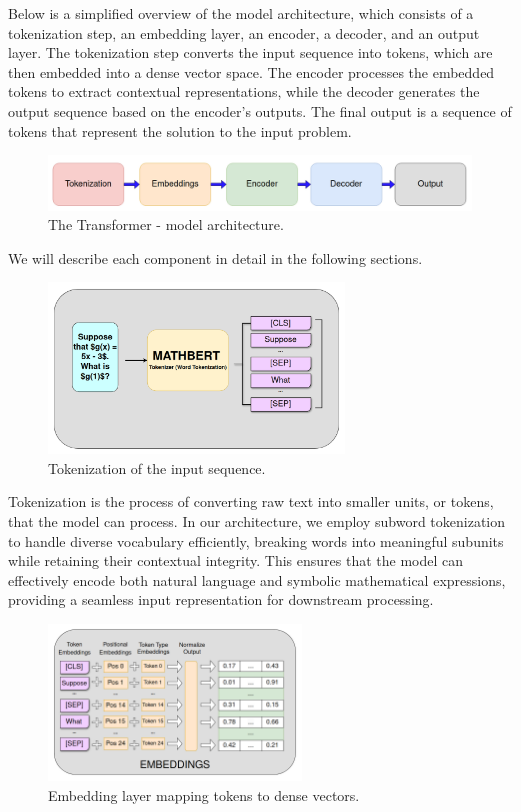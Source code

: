 \documentclass{article}
\begin{document}
Below is a simplified overview of the model architecture, which consists of a tokenization step, an embedding layer, an encoder, a decoder, and an output layer. The tokenization step converts the input sequence into tokens, which are then embedded into a dense vector space. The encoder processes the embedded tokens to extract contextual representations, while the decoder generates the output sequence based on the encoder's outputs. The final output is a sequence of tokens that represent the solution to the input problem.

\begin{figure}[htbp]
  \centering
  \includegraphics[width=\textwidth]{./figures/model_simplified.png}
  \caption{The Transformer - model architecture.}
  \label{fig:model-arch}
\end{figure}

We will describe each component in detail in the following sections.

\begin{figure}[htbp]
  \centering
  \includegraphics[width=0.7\textwidth]{./figures/tokenization.png}
  \caption{Tokenization of the input sequence.}
  \label{fig:tokenization}
\end{figure}

Tokenization is the process of converting raw text into smaller units, or tokens, that the model can process. In our architecture, we employ subword tokenization to handle diverse vocabulary efficiently, breaking words into meaningful subunits while retaining their contextual integrity. This ensures that the model can effectively encode both natural language and symbolic mathematical expressions, providing a seamless input representation for downstream processing.

\begin{figure}[htbp]
  \centering
  \includegraphics[width=0.6\textwidth]{./figures/embeddings.png}
  \caption{Embedding layer mapping tokens to dense vectors.}
  \label{fig:embeddings}
\end{figure}
\end{document}
